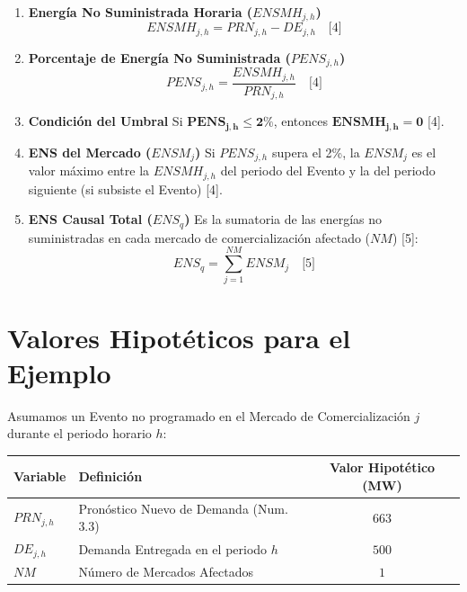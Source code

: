 \documentclass[a5paper]{book}%
\begin{document}
  \begin{enumerate}
  	\item \textbf{Energía No Suministrada Horaria ($ENSMH_{j,h}$)}
  	\begin{equation}
  		ENSMH_{j,h} = PRN_{j,h} - DE_{j,h} \quad \text{[4]}
  	\end{equation}
  	
  	\item \textbf{Porcentaje de Energía No Suministrada ($PENS_{j,h}$)}
  	\begin{equation}
  		PENS_{j,h} = \frac{ENSMH_{j,h}}{PRN_{j,h}} \quad \text{[4]}
  	\end{equation}
  	
  	\item \textbf{Condición del Umbral}
  	Si $\mathbf{PENS_{j,h} \le 2\%}$, entonces $\mathbf{ENSMH_{j,h} = 0}$ [4].
  	
  	\item \textbf{ENS del Mercado ($ENSM_j$)}
  	Si $PENS_{j,h}$ supera el 2\%, la $ENSM_j$ es el valor máximo entre la $ENSMH_{j,h}$ del periodo del Evento y la del periodo siguiente (si subsiste el Evento) [4].
  	
  	\item \textbf{ENS Causal Total ($ENS_q$)}
  	Es la sumatoria de las energías no suministradas en cada mercado de comercialización afectado ($NM$) [5]:
  	\begin{equation}
  		ENS_q = \sum_{j=1}^{NM} ENSM_j \quad \text{[5]}
  	\end{equation}
  \end{enumerate}
  
  \section*{Valores Hipotéticos para el Ejemplo}
  
  Asumamos un Evento no programado en el Mercado de Comercialización $j$ durante el periodo horario $h$:
  
  \begin{center}
  	\begin{tabular}{|l|l|c|}
  		\hline
  		\textbf{Variable} & \textbf{Definición} & \textbf{Valor Hipotético (MW)} \\
  		\hline
  		$PRN_{j,h}$ & Pronóstico Nuevo de Demanda (Num. 3.3) & $663$ \\
  		$DE_{j,h}$ & Demanda Entregada en el periodo $h$ & $500$ \\
  		$NM$ & Número de Mercados Afectados & $1$ \\
  		\hline
  	\end{tabular}
  \end{center}
  
\end{document}
